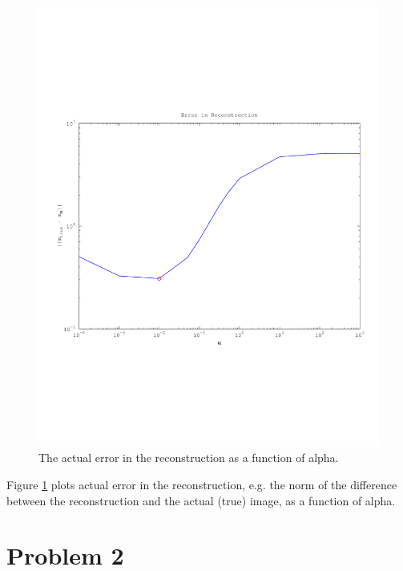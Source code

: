 \documentclass{article}
\begin{document}
\begin{figure}[!htb]
  \includegraphics[scale=.5]{plots/true1d.pdf}
  \caption{The actual error in the reconstruction as a function of
 alpha. } 
 \label{fig:actual}
\end{figure}

Figure \ref{fig:actual} plots actual error in the reconstruction,
e.g. the norm of the difference between the reconstruction and the
actual (true) image, as a function of alpha. 

\newpage
\section{Problem 2}


\end{document}
